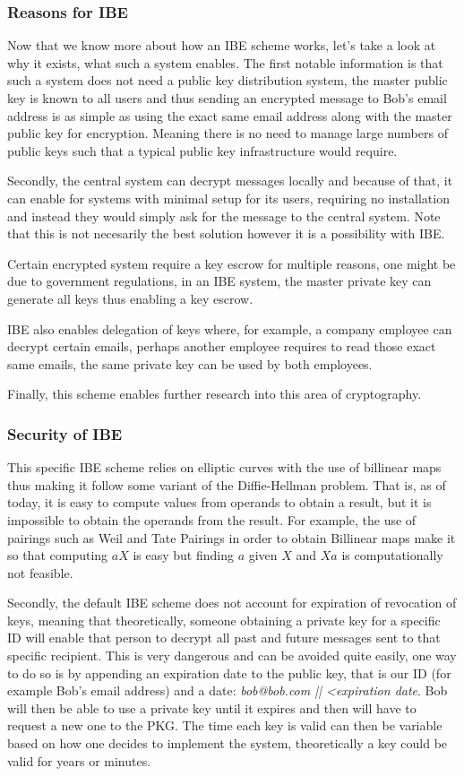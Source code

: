 \documentclass[conference]{IEEEtran}
\begin{document}
\subsubsection{Reasons for IBE}
Now that we know more about how an IBE scheme works, let's take a look at why it exists,
what such a system enables. The first notable information is that such a system
does not need a public key distribution system, the master public key is known to all
users and thus sending an encrypted message to Bob's email address is as simple
as using the exact same email address along with the master public key for encryption. 
Meaning there is no need to manage large numbers of public keys such that a typical
public key infrastructure would require.

Secondly, the central system can decrypt messages locally and because of that,
it can enable for systems with minimal setup for its users, requiring no installation 
and instead they would simply ask for the message to the central system. Note that this 
is not necesarily the best solution however it is a possibility with IBE.


Certain encrypted system require a key escrow for multiple reasons, one might be 
due to government regulations, in an IBE system, the master private key can 
generate all keys thus enabling a key escrow.

IBE also enables delegation of keys where, for example, a company employee can decrypt certain 
emails, perhaps another employee requires to read those exact same emails, the same 
private key can be used by both employees.

Finally, this scheme enables further research into this area of cryptography.


\subsubsection{Security of IBE}
This specific IBE scheme relies on elliptic curves with the use of 
billinear maps thus making it follow some variant of the Diffie-Hellman problem.
That is, as of today, it is easy to compute values from operands to obtain a result,
but it is impossible to obtain the operands from the result.
For example, the use of pairings such as Weil and Tate Pairings in order 
to obtain Billinear maps make it so that computing $aX$ is easy but finding $a$ 
given $X$ and $Xa$ is computationally not feasible.


Secondly, the default IBE scheme does not account for expiration of revocation of keys,
meaning that theoretically, someone obtaining a private key for a specific ID will enable 
that person to decrypt all past and future messages sent to that specific recipient.
This is very dangerous and can be avoided quite easily, one way to do so is by appending an 
expiration date to the public key, that is our ID (for example Bob's email address) and a date:
\textit{bob@bob.com || <expiration date}. Bob will then be able to use a private key until 
it expires and then will have to request a new one to the PKG. The time each key is valid can 
then be variable based on how one decides to implement the system, theoretically a key could 
be valid for years or minutes.
\end{document}
